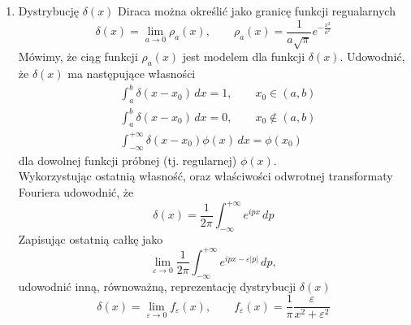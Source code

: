 \documentclass[a4paper,11pt]{article}
\begin{document}
\begin{enumerate}
\item Dystrybucję $\delta( x )$ Diraca można określić jako granicę funkcji regualarnych
  \begin{equation}
    \label{eq:1}
    \delta( x ) = \lim_{ a \to 0 } \rho_{ a }( x ), \qquad
    \rho_{ a }( x ) = \frac{ 1 }{ a \sqrt{ \pi } } e^{ -\frac{ x^{ 2 } }{ a^{ 2 } } }
  \end{equation}
  Mówimy, że ciąg funkcji $\rho_{ a }( x )$ jest modelem dla funkcji $\delta( x )$. Udowodnić, że $\delta( x )$ ma następujące własności
  \begin{align}
    &\int_{ a }^{ b } \delta( x - x_{ 0 } ) \, dx = 1, \qquad
      x_{ 0 } \in ( a, b ) \\
    &\int_{ a }^{ b } \delta( x - x_{ 0 } ) \, dx = 0, \qquad
      x_{ 0 } \notin ( a, b ) \\
    &\int_{ -\infty }^{ +\infty } \delta( x - x_{ 0 } ) \phi( x ) \, dx = \phi( x_{ 0 } )
  \end{align}
  dla dowolnej funkcji próbnej (tj. regularnej) $\phi( x )$. \\
  Wykorzystując
  ostatnią własność, oraz właściwości odwrotnej transformaty Fouriera udowodnić, że
  \begin{equation}
    \label{eq:2}
    \delta( x ) = \frac{ 1 }{ 2\pi } \int_{ -\infty }^{ +\infty } e^{ i p x } \, dp
  \end{equation}
  Zapisując ostatnią całkę jako
  \begin{equation}
    \label{eq:3}
    \lim_{ \varepsilon \to 0 } \frac{ 1 }{ 2\pi } \int_{ -\infty }^{ +\infty } e^{ ipx - \varepsilon | p | } \, dp,
  \end{equation}
  udowodnić inną, równoważną, reprezentację dystrybucji $\delta( x )$
  \begin{equation}
    \label{eq:4}
    \delta( x ) = \lim_{ \varepsilon \to 0 } f_{ \varepsilon }( x ), \qquad
    f_{ \varepsilon }( x ) = \frac{ 1 }{ \pi } \frac{ \varepsilon }{ x^{ 2 } + \varepsilon^{ 2 } }
  \end{equation}







\end{enumerate}
\end{document}
